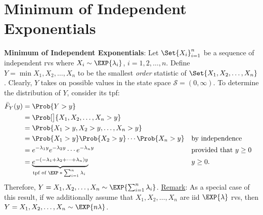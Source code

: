 \section*{Minimum of Independent Exponentials}
\begin{Regular}
    \textbf{Minimum of Independent Exponentials}: Let $ \Set{X_i}_{i=1}^n $ be a sequence of independent rvs where
    $ X_i \sim \EXP{\lambda_i} $, $ i=1,2,\ldots,n $. Define $ Y=\min{X_1,X_2,\ldots,X_n} $ to be the
    smallest \emph{order} statistic of $ \Set{X_1,X_2,\ldots,X_n} $. Clearly, $ Y $ takes on possible values
    in the state space $ \mathcal{S}=(0,\infty) $. To determine the distribution of $ Y $, consider its tpf:
    \begin{align*}
        \bar{F}_Y(y)
         & =\Prob{Y>y}                                                                                                                                          \\
         & =\Prob[\big]{\min{X_1,X_2,\ldots,X_n}>y}                                                                                                             \\
         & =\Prob{X_1>y,X_2>y,\ldots,X_n>y}                                                                                                                     \\
         & =\Prob{X_1>y}\Prob{X_2>y}\cdots\Prob{X_n>y}                                                                     &  & \text{by independence}          \\
         & =e^{-\lambda_1y}e^{-\lambda_2y}\cdots e^{-\lambda_n y}                                                          &  & \text{provided that $ y\ge 0 $} \\
         & =\underbrace{e^{-(-\lambda_1+\lambda_2+\cdots+\lambda_n)y}}_{\text{tpf of $ \EXP*{\sum_{i=1}^{n}\lambda_i} $ }} &  & y\ge 0.
    \end{align*}
    Therefore, $ Y=\min{X_1,X_2,\ldots,X_n}\sim \EXP{\sum_{i=1}^{n}\lambda_i} $.
    \tcblower{}
    \underline{Remark}: As a special case of this result, if we additionally assume that $ X_1,X_2,\ldots,X_n $
    are iid $ \EXP{\lambda} $ rvs, then $ Y=\min{X_1,X_2,\ldots,X_n}\sim \EXP{n\lambda} $.
\end{Regular}
